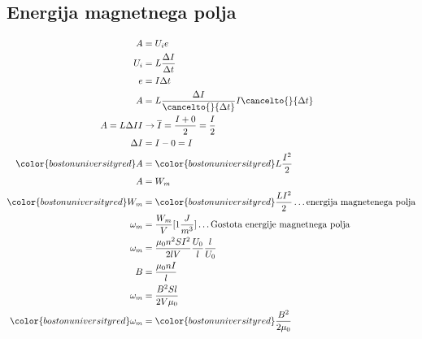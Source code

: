 {\color{indiagreen}\subsection{Energija magnetnega polja}}
\begin{align*}
	A &= U_i e\\
	U_i &= L \frac{\Delta I}{\Delta t}\\
	e &= I \Delta t\\
	A &= L \frac{\Delta I}{\cancelto{}{\Delta t}} I \cancelto{}{\Delta t}\\
	A = L \Delta I I &\rightarrow \overline{I} = \frac{I + 0}{2} = \frac{I}{2}\\
	\Delta I &= I - 0 = I\\
	{\color{bostonuniversityred}A} &= {\color{bostonuniversityred}L\frac{I^2}{2}}\\
	A &= W_m\\
	{\color{bostonuniversityred}W_m} &= {\color{bostonuniversityred}\frac{LI^2}{2}} \dots \text{energija magnetenega polja}\\
	\omega_m &= \frac{W_m}{V}[1\frac{J}{m^3}] \dots \text{Gostota energije magnetnega polja}\\ 
	\omega_m &= \frac{\mu_0 n^2 S I^2}{2lV} \frac{U_0}{l} \frac{l}{U_0}\\
	B &= \frac{\mu_0 n I}{l}\\
	\omega_m &= \frac{B^2 Sl}{2V \mu_0}\\
	{\color{bostonuniversityred}\omega_m} &= {\color{bostonuniversityred}\frac{B^2}{2\mu_0}}\\
\end{align*}
